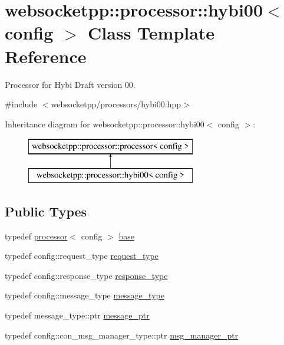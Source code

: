 \hypertarget{classwebsocketpp_1_1processor_1_1hybi00}{}\section{websocketpp\+:\+:processor\+:\+:hybi00$<$ config $>$ Class Template Reference}
\label{classwebsocketpp_1_1processor_1_1hybi00}


Processor for Hybi Draft version 00.  




{\ttfamily \#include $<$websocketpp/processors/hybi00.\+hpp$>$}

Inheritance diagram for websocketpp\+:\+:processor\+:\+:hybi00$<$ config $>$\+:\begin{figure}[H]
\begin{center}
\leavevmode
\includegraphics[height=2.000000cm]{classwebsocketpp_1_1processor_1_1hybi00}
\end{center}
\end{figure}
\subsection*{Public Types}
\begin{DoxyCompactItemize}
\item 
typedef \hyperlink{classwebsocketpp_1_1processor_1_1processor}{processor}$<$ config $>$ \hyperlink{classwebsocketpp_1_1processor_1_1hybi00_ae8842975f6937e834d7df16ecf5b756f}{base}
\item 
typedef config\+::request\+\_\+type \hyperlink{classwebsocketpp_1_1processor_1_1hybi00_a9992ac4efa9cc4d46ee0e9e1060cf860}{request\+\_\+type}
\item 
typedef config\+::response\+\_\+type \hyperlink{classwebsocketpp_1_1processor_1_1hybi00_abef7fc8290a6d30e086c639d5e0b393d}{response\+\_\+type}
\item 
typedef config\+::message\+\_\+type \hyperlink{classwebsocketpp_1_1processor_1_1hybi00_a68b8a926b9fc5fcd296cb698920280ab}{message\+\_\+type}
\item 
typedef message\+\_\+type\+::ptr \hyperlink{classwebsocketpp_1_1processor_1_1hybi00_a300a0810d09570108e3dd747d97a8257}{message\+\_\+ptr}
\item 
typedef config\+::con\+\_\+msg\+\_\+manager\+\_\+type\+::ptr \hyperlink{classwebsocketpp_1_1processor_1_1hybi00_aa33fb6bfdb3c905f267ba7d0c48b192e}{msg\+\_\+manager\+\_\+ptr}
\end{DoxyCompactItemize}
